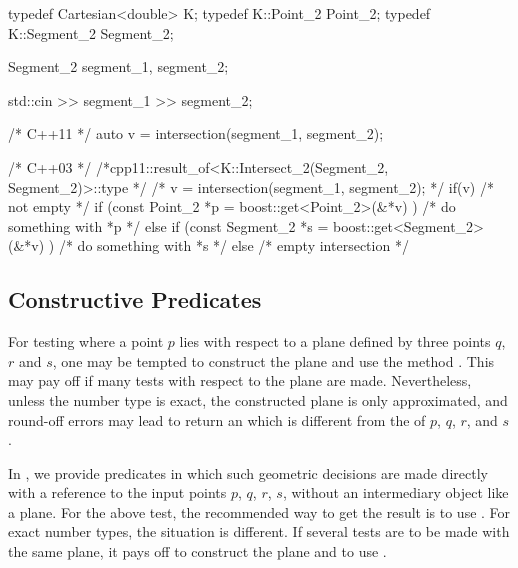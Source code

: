 \ccHtmlLinksOff%
\begin{cprog}
    typedef Cartesian<double>  K;
    typedef K::Point_2         Point_2;
    typedef K::Segment_2       Segment_2;

    Segment_2 segment_1, segment_2;

    std::cin >> segment_1 >> segment_2;
 
    /* C++11 */
    auto v = intersection(segment_1, segment_2);

    /* C++03 */
    /*cpp11::result_of<K::Intersect_2(Segment_2, Segment_2)>::type */
    /* v = intersection(segment_1, segment_2); */
    if(v) {
      /* not empty */
      if (const Point_2 *p = boost::get<Point_2>(&*v) ) {
        /* do something with *p */
      } else if (const Segment_2 *s = boost::get<Segment_2>(&*v) ) {
        /* do something with *s */
      }
    } else {
      /* empty intersection */
    }
\end{cprog}
\ccHtmlLinksOn%

\subsection{Constructive Predicates}
For testing where a point $p$ lies with respect to a plane defined by three
points $q$, $r$ and $s$, one may be tempted to construct the plane
 and use the method . 
This may pay off if many tests with respect to the plane are made. 
Nevertheless, unless the number type is exact, the constructed plane 
is only approximated, and round-off errors may lead 
 to return an  
which is different from the  of $p$, $q$, $r$, 
and $s$.

In {\cgal}, we provide predicates in which such
geometric decisions are made directly with a reference to the input points
$p$, $q$, $r$, $s$, without an intermediary object like a plane. 
For the above test, the recommended way to get the result is to use
. For exact number types, the situation is different.
If several tests are to be made with the same
plane, it pays off to construct the plane and to use .

